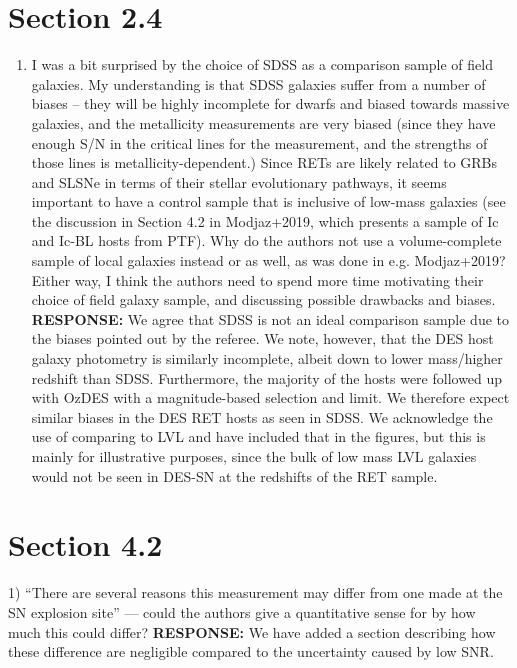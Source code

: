 \documentclass{article}
\begin{document}
\section*{Section 2.4} 

\begin{enumerate}
    \item I was a bit surprised by the choice of SDSS as a comparison sample of field galaxies. My understanding is that SDSS galaxies suffer from a number of biases -- they will be highly incomplete for dwarfs and biased towards massive galaxies, and the metallicity measurements are very biased (since they have enough S/N in the critical lines for the measurement, and the strengths of those lines is metallicity-dependent.) Since RETs are likely related to GRBs and SLSNe in terms of their stellar evolutionary pathways, it seems important to have a control sample that is inclusive of low-mass galaxies (see the discussion in Section 4.2 in Modjaz+2019, which presents a sample of Ic and Ic-BL hosts from PTF). Why do the authors not use a volume-complete sample of local galaxies instead or as well, as was done in e.g. Modjaz+2019? Either way, I think the authors need to spend more time motivating their choice of field galaxy sample, and discussing possible drawbacks and biases.
   \vskip0.1cm
 {\bf RESPONSE: } We agree that SDSS is not an ideal comparison sample due to the biases pointed out by the referee. We note, however, that the DES host galaxy photometry is similarly incomplete, albeit down to lower mass/higher redshift than SDSS. Furthermore, the majority of the hosts were followed up with OzDES with a magnitude-based selection and limit. We therefore expect similar biases in the DES RET hosts as seen in SDSS. 
 We acknowledge the use of comparing to LVL and have included that in the figures, but this is mainly for illustrative purposes, since the bulk of low mass LVL galaxies would not be seen in DES-SN at the redshifts of the RET sample.
    
\end{enumerate}

\section*{Section 4.2}
1) “There are several reasons this measurement may differ from one made at the SN explosion site” — could the authors give a quantitative sense for by how much this could differ?
   \vskip0.1cm
 {\bf RESPONSE: } We have added a section describing how these difference are negligible compared to the uncertainty caused by low SNR.
\end{document}
